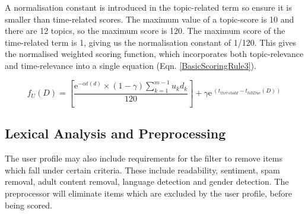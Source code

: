 A normalisation constant is introduced in the topic-related term so ensure it is smaller than time-related scores. The maximum value of a topic-score is 10 and there are 12 topics, so the maximum score is 120. The maximum score of the time-related term is 1, giving us the normalisation constant of 1/120.
This gives the normalised weighted scoring function, which incorporates both topic-relevance and time-relevance into a single equation (Eqn. \ref{BasicScoringRule3}).

\begin{equation}\label{BasicScoringRule3}
	f_U (D) = \left[\frac{{\mathrm{e}}^{-\alpha t(d)} \times (1-\gamma) \sum_{k=1}^{m-1} u_kd_k}{120} \right] + \gamma{\mathrm{e}}^{\ (t_{threshold}-t_{tillDue}(D))}
\end{equation}

\subsection{Lexical Analysis and Preprocessing}

The user profile may also include requirements for the filter to remove items which fall under certain criteria. These include readability, sentiment, spam removal, adult content removal, language detection and gender detection. The preprocessor will eliminate items which are excluded by the user profile, before being scored. 
